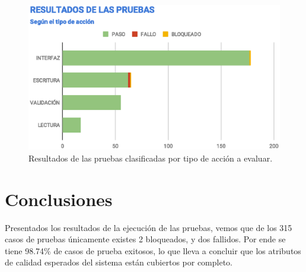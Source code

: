 \begin{figure}
\centering
\includegraphics[width=1.0\textwidth]{graphics/results-type.eps}
\caption{Resultados de las pruebas clasificadas por tipo de acción a evaluar.}
\label{results-type}
\end{figure}

\section{Conclusiones}
Presentados los resultados de la ejecución de las pruebas, vemos que de los 315
casos de pruebas únicamente existes 2 bloqueados, y dos fallidos. Por ende se
tiene 98.74\% de casos de prueba exitosos, lo que lleva a concluir que los
atributos de calidad esperados del sistema están cubiertos por completo.

